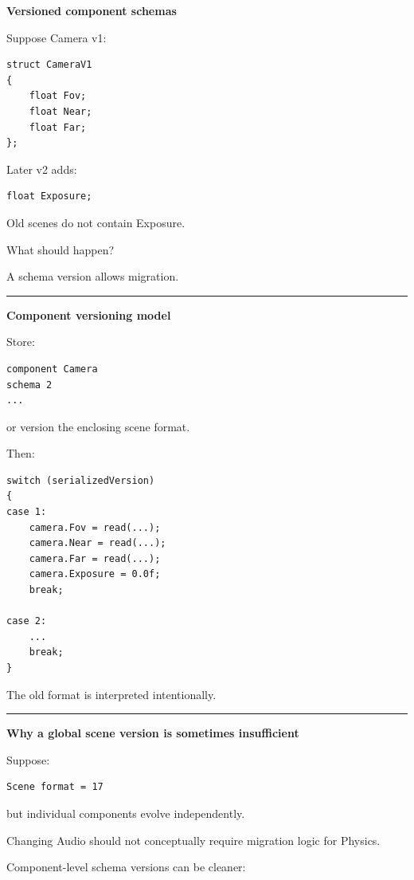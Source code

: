 \textbf{Versioned component schemas}

Suppose Camera v1:

\begin{verbatim}
struct CameraV1
{
    float Fov;
    float Near;
    float Far;
};
\end{verbatim}

Later v2 adds:

\begin{verbatim}
float Exposure;
\end{verbatim}

Old scenes do not contain Exposure.

What should happen?

A schema version allows migration.

\begin{center}\rule{0.5\linewidth}{0.5pt}\end{center}

\textbf{Component versioning model}

Store:

\begin{verbatim}
component Camera
schema 2
...
\end{verbatim}

or version the enclosing scene format.

Then:

\begin{verbatim}
switch (serializedVersion)
{
case 1:
    camera.Fov = read(...);
    camera.Near = read(...);
    camera.Far = read(...);
    camera.Exposure = 0.0f;
    break;

case 2:
    ...
    break;
}
\end{verbatim}

The old format is interpreted intentionally.

\begin{center}\rule{0.5\linewidth}{0.5pt}\end{center}

\textbf{Why a global scene version is sometimes insufficient}

Suppose:

\begin{verbatim}
Scene format = 17
\end{verbatim}

but individual components evolve independently.

Changing Audio should not conceptually require migration logic for Physics.

Component-level schema versions can be cleaner:

